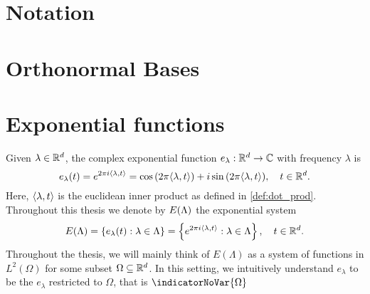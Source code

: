 \documentclass[../thesis.tex]{subfiles}
\begin{document}
\section{Notation}
    

\section{Orthonormal Bases}
    


\section{Exponential functions}
Given $\lambda \in \mathbb{R}^d$, the complex exponential function $e_{\lambda}: \mathbb{R}^d \rightarrow \mathbb{C}$ with frequency $\lambda$ is 
\begin{equation}
    e_{\lambda}(t) = e^{2 \pi i \langle \lambda, t \rangle} = \cos{(2 \pi \langle \lambda, t \rangle)} + i \sin{(2 \pi \langle \lambda, t \rangle)}, \quad t\in \mathbb{R}^d.
\end{equation}
Here, $\langle \lambda, t \rangle$ is the euclidean inner product as defined in \cref{def:dot_prod}. Throughout this thesis we denote by $E(\Lambda)$ the exponential system
\begin{align}
    E(\Lambda) = \left\{e_\lambda(t) : \lambda \in \Lambda\right\} = \left\{e^{2\pi i \langle \lambda, t \rangle} : \lambda \in \Lambda\right\}, \quad t\in \mathbb{R}^d.
\end{align}
Throughout the thesis, we will mainly think of $E(\Lambda)$ as a system of functions in $L^2(\Omega)$ for some subset $\Omega \subseteq \mathbb{R}^d$. In this setting, we intuitively understand $e_\lambda$ to be the $e_\lambda$ restricted to $\Omega$, that is $\indicatorNoVar{\Omega}$
\end{document}

